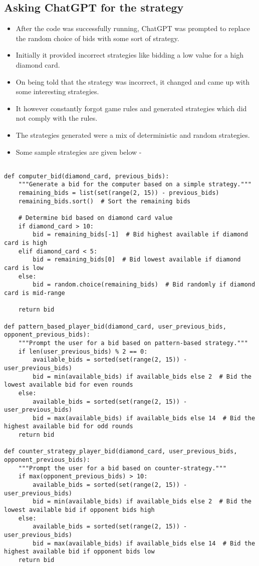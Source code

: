 \documentclass{article}
\begin{document}
\subsection{Asking ChatGPT for the strategy}
\begin{itemize}
\item After the code was successfully running, ChatGPT was prompted to replace the random choice of bids with some sort of strategy. 
\item Initially it provided incorrect strategies like bidding a low value for a high diamond card.
\item On being told that the strategy was incorrect, it changed and came up with some interesting strategies. 
\item It however constantly forgot game rules and generated strategies which did not comply with the rules.
\item The strategies generated were a mix of deterministic and random strategies.
\item Some sample strategies are given below - 
\end{itemize}
\begin{verbatim}

def computer_bid(diamond_card, previous_bids):
    """Generate a bid for the computer based on a simple strategy."""
    remaining_bids = list(set(range(2, 15)) - previous_bids)
    remaining_bids.sort()  # Sort the remaining bids

    # Determine bid based on diamond card value
    if diamond_card > 10:
        bid = remaining_bids[-1]  # Bid highest available if diamond card is high
    elif diamond_card < 5:
        bid = remaining_bids[0]  # Bid lowest available if diamond card is low
    else:
        bid = random.choice(remaining_bids)  # Bid randomly if diamond card is mid-range

    return bid

def pattern_based_player_bid(diamond_card, user_previous_bids, opponent_previous_bids):
    """Prompt the user for a bid based on pattern-based strategy."""
    if len(user_previous_bids) % 2 == 0:
        available_bids = sorted(set(range(2, 15)) - user_previous_bids)
        bid = min(available_bids) if available_bids else 2  # Bid the lowest available bid for even rounds
    else:
        available_bids = sorted(set(range(2, 15)) - user_previous_bids)
        bid = max(available_bids) if available_bids else 14  # Bid the highest available bid for odd rounds
    return bid

def counter_strategy_player_bid(diamond_card, user_previous_bids, opponent_previous_bids):
    """Prompt the user for a bid based on counter-strategy."""
    if max(opponent_previous_bids) > 10:
        available_bids = sorted(set(range(2, 15)) - user_previous_bids)
        bid = min(available_bids) if available_bids else 2  # Bid the lowest available bid if opponent bids high
    else:
        available_bids = sorted(set(range(2, 15)) - user_previous_bids)
        bid = max(available_bids) if available_bids else 14  # Bid the highest available bid if opponent bids low
    return bid
\end{verbatim}
\end{document}
